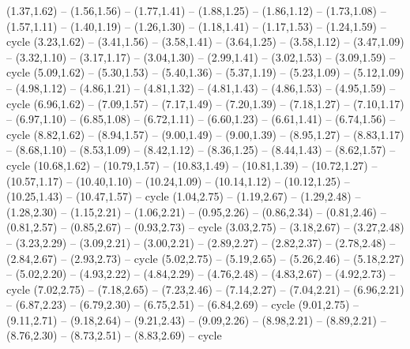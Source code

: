 \providecommand\Tissot[1]{\csname geo:Tissot:#1\endcsname}
\def\TissotListe{k1,k2,k3,k4,k5,k6,k7,k8,k9,k10,k11,k12,k13,k14,k15,k16,k17,k18,k19,k20,k21,k22,k23,k24,k25,k26,k27,k28,k29,k30}
\expandafter\def\csname geo:Tissot:k1\endcsname{
  (1.37,1.62) -- (1.56,1.56) -- (1.77,1.41) -- (1.88,1.25) -- (1.86,1.12) -- (1.73,1.08) -- (1.57,1.11) -- (1.40,1.19) -- (1.26,1.30) -- (1.18,1.41) -- (1.17,1.53) -- (1.24,1.59) -- cycle}
\expandafter\def\csname geo:Tissot:k2\endcsname{
  (3.23,1.62) -- (3.41,1.56) -- (3.58,1.41) -- (3.64,1.25) -- (3.58,1.12) -- (3.47,1.09) -- (3.32,1.10) -- (3.17,1.17) -- (3.04,1.30) -- (2.99,1.41) -- (3.02,1.53) -- (3.09,1.59) -- cycle}
\expandafter\def\csname geo:Tissot:k3\endcsname{
  (5.09,1.62) -- (5.30,1.53) -- (5.40,1.36) -- (5.37,1.19) -- (5.23,1.09) -- (5.12,1.09) -- (4.98,1.12) -- (4.86,1.21) -- (4.81,1.32) -- (4.81,1.43) -- (4.86,1.53) -- (4.95,1.59) -- cycle}
\expandafter\def\csname geo:Tissot:k4\endcsname{
  (6.96,1.62) -- (7.09,1.57) -- (7.17,1.49) -- (7.20,1.39) -- (7.18,1.27) -- (7.10,1.17) -- (6.97,1.10) -- (6.85,1.08) -- (6.72,1.11) -- (6.60,1.23) -- (6.61,1.41) -- (6.74,1.56) -- cycle}
\expandafter\def\csname geo:Tissot:k5\endcsname{
  (8.82,1.62) -- (8.94,1.57) -- (9.00,1.49) -- (9.00,1.39) -- (8.95,1.27) -- (8.83,1.17) -- (8.68,1.10) -- (8.53,1.09) -- (8.42,1.12) -- (8.36,1.25) -- (8.44,1.43) -- (8.62,1.57) -- cycle}
\expandafter\def\csname geo:Tissot:k6\endcsname{
  (10.68,1.62) -- (10.79,1.57) -- (10.83,1.49) -- (10.81,1.39) -- (10.72,1.27) -- (10.57,1.17) -- (10.40,1.10) -- (10.24,1.09) -- (10.14,1.12) -- (10.12,1.25) -- (10.25,1.43) -- (10.47,1.57) -- cycle}
\expandafter\def\csname geo:Tissot:k7\endcsname{
  (1.04,2.75) -- (1.19,2.67) -- (1.29,2.48) -- (1.28,2.30) -- (1.15,2.21) -- (1.06,2.21) -- (0.95,2.26) -- (0.86,2.34) -- (0.81,2.46) -- (0.81,2.57) -- (0.85,2.67) -- (0.93,2.73) -- cycle}
\expandafter\def\csname geo:Tissot:k8\endcsname{
  (3.03,2.75) -- (3.18,2.67) -- (3.27,2.48) -- (3.23,2.29) -- (3.09,2.21) -- (3.00,2.21) -- (2.89,2.27) -- (2.82,2.37) -- (2.78,2.48) -- (2.84,2.67) -- (2.93,2.73) -- cycle}
\expandafter\def\csname geo:Tissot:k9\endcsname{
  (5.02,2.75) -- (5.19,2.65) -- (5.26,2.46) -- (5.18,2.27) -- (5.02,2.20) -- (4.93,2.22) -- (4.84,2.29) -- (4.76,2.48) -- (4.83,2.67) -- (4.92,2.73) -- cycle}
\expandafter\def\csname geo:Tissot:k10\endcsname{
  (7.02,2.75) -- (7.18,2.65) -- (7.23,2.46) -- (7.14,2.27) -- (7.04,2.21) -- (6.96,2.21) -- (6.87,2.23) -- (6.79,2.30) -- (6.75,2.51) -- (6.84,2.69) -- cycle}
\expandafter\def\csname geo:Tissot:k11\endcsname{
  (9.01,2.75) -- (9.11,2.71) -- (9.18,2.64) -- (9.21,2.43) -- (9.09,2.26) -- (8.98,2.21) -- (8.89,2.21) -- (8.76,2.30) -- (8.73,2.51) -- (8.83,2.69) -- cycle}
